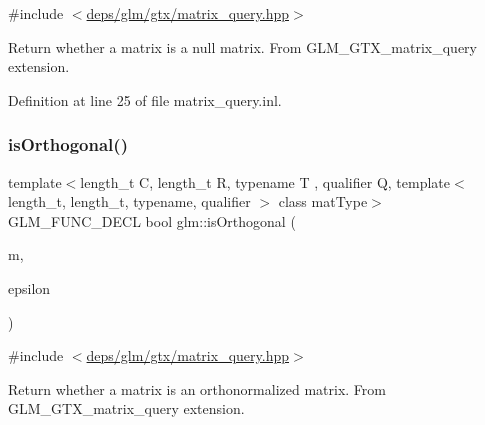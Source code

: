 {\ttfamily \#include $<$\hyperlink{matrix__query_8hpp}{deps/glm/gtx/matrix\+\_\+query.\+hpp}$>$}

Return whether a matrix is a null matrix. From G\+L\+M\+\_\+\+G\+T\+X\+\_\+matrix\+\_\+query extension. 

Definition at line 25 of file matrix\+\_\+query.\+inl.

\mbox{\label{group__gtx__matrix__query_ga58f3289f74dcab653387dd78ad93ca40}} 
\subsubsection{\texorpdfstring{is\+Orthogonal()}{isOrthogonal()}}
{\footnotesize\ttfamily template$<$length\+\_\+t C, length\+\_\+t R, typename T , qualifier Q, template$<$ length\+\_\+t, length\+\_\+t, typename, qualifier $>$ class mat\+Type$>$ \\
G\+L\+M\+\_\+\+F\+U\+N\+C\+\_\+\+D\+E\+CL bool glm\+::is\+Orthogonal (\begin{DoxyParamCaption}\item[{mat\+Type$<$ C, R, T, Q $>$ const \&}]{m,  }\item[{T const \&}]{epsilon }\end{DoxyParamCaption})}



{\ttfamily \#include $<$\hyperlink{matrix__query_8hpp}{deps/glm/gtx/matrix\+\_\+query.\+hpp}$>$}

Return whether a matrix is an orthonormalized matrix. From G\+L\+M\+\_\+\+G\+T\+X\+\_\+matrix\+\_\+query extension. 